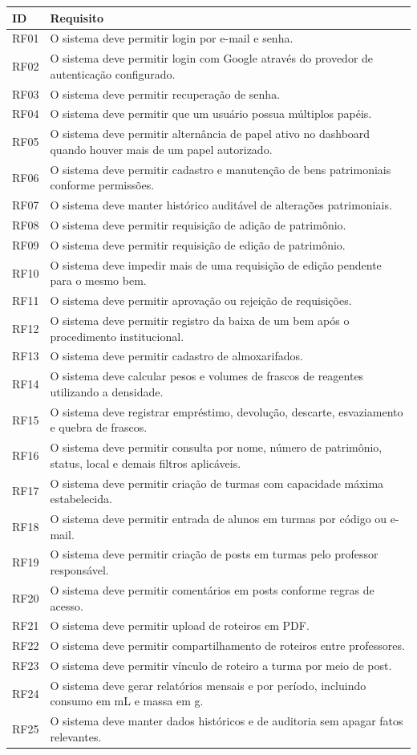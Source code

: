 \documentclass[12pt,a4paper]{article}
\begin{document}
\begin{longtable}{p{} p{}}
\toprule
\textbf{ID} & \textbf{Requisito}\\
\midrule
RF01 & O sistema deve permitir login por e-mail e senha.\\
RF02 & O sistema deve permitir login com Google através do provedor de autenticação configurado.\\
RF03 & O sistema deve permitir recuperação de senha.\\
RF04 & O sistema deve permitir que um usuário possua múltiplos papéis.\\
RF05 & O sistema deve permitir alternância de papel ativo no dashboard quando houver mais de um papel autorizado.\\
RF06 & O sistema deve permitir cadastro e manutenção de bens patrimoniais conforme permissões.\\
RF07 & O sistema deve manter histórico auditável de alterações patrimoniais.\\
RF08 & O sistema deve permitir requisição de adição de patrimônio.\\
RF09 & O sistema deve permitir requisição de edição de patrimônio.\\
RF10 & O sistema deve impedir mais de uma requisição de edição pendente para o mesmo bem.\\
RF11 & O sistema deve permitir aprovação ou rejeição de requisições.\\
RF12 & O sistema deve permitir registro da baixa de um bem após o procedimento institucional.\\
RF13 & O sistema deve permitir cadastro de almoxarifados.\\
RF14 & O sistema deve calcular pesos e volumes de frascos de reagentes utilizando a densidade.\\
RF15 & O sistema deve registrar empréstimo, devolução, descarte, esvaziamento e quebra de frascos.\\
RF16 & O sistema deve permitir consulta por nome, número de patrimônio, status, local e demais filtros aplicáveis.\\
RF17 & O sistema deve permitir criação de turmas com capacidade máxima estabelecida.\\
RF18 & O sistema deve permitir entrada de alunos em turmas por código ou e-mail.\\
RF19 & O sistema deve permitir criação de posts em turmas pelo professor responsável.\\
RF20 & O sistema deve permitir comentários em posts conforme regras de acesso.\\
RF21 & O sistema deve permitir upload de roteiros em PDF.\\
RF22 & O sistema deve permitir compartilhamento de roteiros entre professores.\\
RF23 & O sistema deve permitir vínculo de roteiro a turma por meio de post.\\
RF24 & O sistema deve gerar relatórios mensais e por período, incluindo consumo em mL e massa em g.\\
RF25 & O sistema deve manter dados históricos e de auditoria sem apagar fatos relevantes.\\
\bottomrule
\end{longtable}
\end{document}
